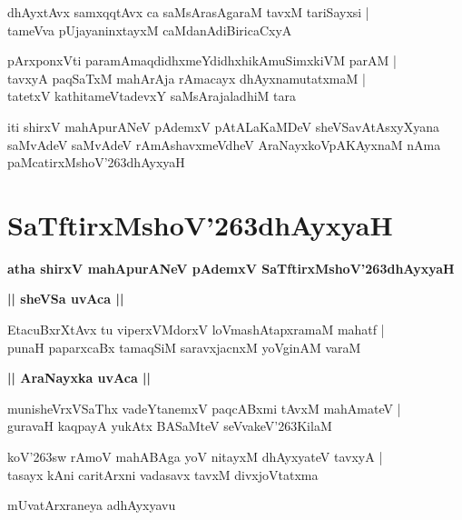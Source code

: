 \documentclass[twoside,12pt,openright]{book}
\def\S{\char'263}
\newcounter{shloka}[chapter]
\def\uvaca#1{\centerline{{\large\textbf{#1}}}}
\begin{document}
\begin{shloka}%
dhAyxtAvx samxqqtAvx ca saMsArasAgaraM tavxM tariSayxsi |\\
tameVva pUjayaninxtayxM caMdanAdiBiricaCxyA 
\end{shloka}

\begin{shloka}%
pArxponxVti paramAmaqdidhxmeYdidhxhikAmuSimxkiVM parAM |\\
tavxyA paqSaTxM mahArAja rAmacayx dhAyxnamutatxmaM |\\
tatetxV kathitameVtadevxY saMsArajaladhiM tara
\end{shloka}

\begin{center}
iti shirxV mahApurANeV pAdemxV pAtALaKaMDeV sheVSavAtAsxyXyana saMvAdeV 
saMvAdeV rAmAshavxmeVdheV AraNayxkoVpAKAyxnaM nAma paMcatirxMshoV\S dhAyxyaH
\end{center}

\chapter{SaTftirxMshoV\S dhAyxyaH}

\begin{center}
{\LARGE\bfseries atha shirxV mahApurANeV pAdemxV SaTftirxMshoV\S dhAyxyaH}
\end{center}

\uvaca{|| sheVSa uvAca ||}

\begin{shloka}%
EtacuBxrXtAvx tu viperxVMdorxV loVmashAtapxramaM mahatf |\\
punaH paparxcaBx tamaqSiM saravxjacnxM yoVginAM varaM 
\end{shloka}

\uvaca{|| AraNayxka uvAca ||}

\begin{shloka}%
munisheVrxVSaThx vadeYtanemxV paqcABxmi tAvxM mahAmateV |\\
guravaH kaqpayA yukAtx BASaMteV seVvakeV\S KilaM 
\end{shloka}

\begin{shloka}%
koV\S sw rAmoV mahABAga yoV nitayxM dhAyxyateV tavxyA |\\
tasayx kAni caritArxni vadasavx tavxM divxjoVtatxma
\end{shloka}

\begin{center}
mUvatArxraneya adhAyxyavu
\end{center}
\end{document}

